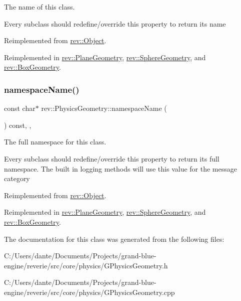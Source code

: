 The name of this class. 

Every subclass should redefine/override this property to return its name 

Reimplemented from \mbox{\hyperlink{classrev_1_1_object_a7a2013f91169479b65cf93afdc5d9a68}{rev\+::\+Object}}.



Reimplemented in \mbox{\hyperlink{classrev_1_1_plane_geometry_a20bc1985065668b3e9716c8252d6b070}{rev\+::\+Plane\+Geometry}}, \mbox{\hyperlink{classrev_1_1_sphere_geometry_ac7447dddbb37769070e302792ced7ac2}{rev\+::\+Sphere\+Geometry}}, and \mbox{\hyperlink{classrev_1_1_box_geometry_a2e815ff8c55805fdbb74eedf7b2c16c5}{rev\+::\+Box\+Geometry}}.

\mbox{\label{classrev_1_1_physics_geometry_ad4311205e1a6eabeeb7773a01d11add5}} 
\subsubsection{\texorpdfstring{namespaceName()}{namespaceName()}}
{\footnotesize\ttfamily const char$\ast$ rev\+::\+Physics\+Geometry\+::namespace\+Name (\begin{DoxyParamCaption}{ }\end{DoxyParamCaption}) const\hspace{0.3cm}{\ttfamily [inline]}, {\ttfamily [override]}, {\ttfamily [virtual]}}



The full namespace for this class. 

Every subclass should redefine/override this property to return its full namespace. The built in logging methods will use this value for the message category 

Reimplemented from \mbox{\hyperlink{classrev_1_1_object_aaeb638d3e10f361c56c211a318a27f3d}{rev\+::\+Object}}.



Reimplemented in \mbox{\hyperlink{classrev_1_1_plane_geometry_aafaa3b1c3f1e103cf4aa2d9a2ce9feb1}{rev\+::\+Plane\+Geometry}}, \mbox{\hyperlink{classrev_1_1_sphere_geometry_aef6068a1ad9dc22c0ae744898923b7a2}{rev\+::\+Sphere\+Geometry}}, and \mbox{\hyperlink{classrev_1_1_box_geometry_a2a3b42da46821366322cfecf569e2b5f}{rev\+::\+Box\+Geometry}}.



The documentation for this class was generated from the following files\+:\begin{DoxyCompactItemize}
\item 
C\+:/\+Users/dante/\+Documents/\+Projects/grand-\/blue-\/engine/reverie/src/core/physics/G\+Physics\+Geometry.\+h\item 
C\+:/\+Users/dante/\+Documents/\+Projects/grand-\/blue-\/engine/reverie/src/core/physics/G\+Physics\+Geometry.\+cpp\end{DoxyCompactItemize}
